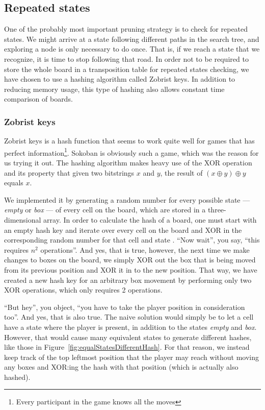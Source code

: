 \documentclass[a4paper,11pt]{article}
\renewcommand{\*}[0]{\cdot}
\begin{document}
\subsection{Repeated states}

One of the probably most important pruning strategy is to check for repeated
states. We might arrive at a state following different paths in the search tree,
and exploring a node is only necessary to do once. That is, if we reach a state
that we recognize, it is time to stop following that road. In order not to be
required to store the whole board in a transposition table for repeated states
checking, we have chosen to use a hashing algorithm called Zobrist keys. In
addition to reducing memory usage, this type of hashing also allows constant
time comparison of boards.


\subsubsection{Zobrist keys}

Zobrist keys is a hash function that seems to work quite well for games that has
perfect information\footnote{Every participant in the game knows all the moves}.
Sokoban is obviously such a game, which was the reason for us trying it out. The
hashing algorithm makes heavy use of the XOR operation and its property that
given two bitstrings $x$ and $y$, the result of $(x \oplus y) \oplus y$ equals
$x$.

We implemented it by generating a random number for every possible state ---
\emph{empty} or \emph{box} --- of every cell on the board, which are stored in a
three-dimensional array. In order to calculate the hash of a board, one must
start with an empty hash key and iterate over every cell on the board and
XOR in the corresponding random number for that cell and state . ``Now wait'',
you say, ``this requires $n^2$ operations''. And yes, that is true, however, the
next time we make changes to boxes on the board, we simply XOR out the box that
is being moved from its previous position and XOR it in to the new position.
That way, we have created a new hash key for an arbitrary box movement by
performing only two XOR operations, which only requires 2 operations.

``But hey'', you object, ``you have to take the player position in
consideration too''. And yes, that is also true. The naive solution would
simply be to let a cell have a state where the player is present, in addition
to the states \emph{empty} and \emph{box}. However, that would cause many
equivalent states to generate different hashes, like those in
Figure~\ref{fig:equalStatesDifferentHash}. For that reason, we instead keep
track of the top leftmost position that the player may reach without moving any
boxes and XOR:ing the hash with that position (which is actually also hashed).
\end{document}
